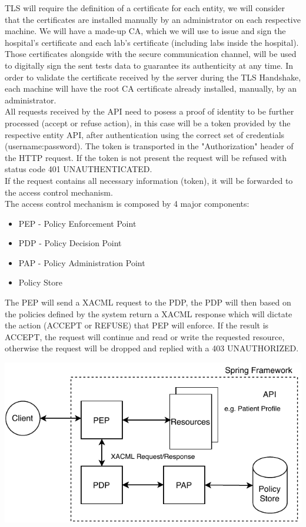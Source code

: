 TLS will require the definition of a certificate for each entity, we will consider that the certificates are installed manually by an administrator on each respective machine.
We will have a made-up CA, which we will use to issue and sign the hospital's certificate and each lab's certificate (including labs inside the hospital). Those certificates alongside with the secure communication channel, will be used to digitally sign the sent tests data to guarantee its authenticity at any time.
In order to validate the certificate received by the server during the TLS Handshake, each machine will have the root CA certificate already installed, manually, by an administrator.\\ 

All requests received by the API need to posess a proof of identity to be further processed (accept or refuse action), in this case will be a token provided by the respective entity API, after authentication using the correct set of credentials (username:password). The token is transported in the "Authorization" header of the HTTP request. If the token is not present the request will be refused with status code 401 UNAUTHENTICATED. \\

If the request contains all necessary information (token), it will be forwarded to the access control mechanism. \\

The access control mechanism is composed by 4 major components:
\begin{itemize}
	\item PEP - Policy Enforcement Point
	\item PDP - Policy Decision Point
	\item PAP - Policy Administration Point
	\item Policy Store
\end{itemize}

The PEP will send a XACML request to the PDP, the PDP will then based on the policies defined by the system return a XACML response which will dictate the action (ACCEPT or REFUSE) that PEP will enforce. If the result is ACCEPT, the request will continue and read or write the requested resource, otherwise the request will be dropped and replied with a 403 UNAUTHORIZED.

	\includegraphics[width=.6\textwidth]{figs/access_control.pdf}
	

